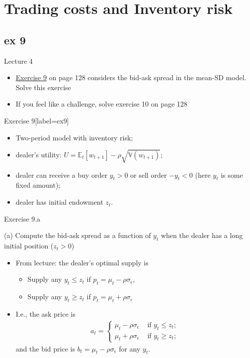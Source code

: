 \documentclass[english,10pt]{beamer}
\begin{document}
\section{Trading costs and Inventory risk}
\subsection{ex 9}

\begin{frame}{Lecture 4}
	\begin{itemize}
		\item \hyperlink{ex9}{Exercise 9} on page 128 considers the bid-ask spread in the mean-SD model. Solve this exercise
		\item If you feel like a challenge, solve exercise 10 on page 128
	\end{itemize}
\end{frame}


\begin{frame}{Exercise 9}[label=ex9]
	\begin{itemize}
		\item Two-period model with inventory risk;
		\item dealer's utility: $U = \mathbb{E}_t [w_{t+1}] - \rho \sqrt{\mathbb{V}(w_{t+1})}$;
		\item dealer can receive a buy order $y_t > 0$ or sell order $-y_t < 0$ (here $y_t$ is some fixed amount);
		\item dealer has initial endowment $z_t$.
	\end{itemize}
\end{frame}


\begin{frame}{Exercise 9.a}
	\begin{exampleblock}{}
		(a) Compute the bid-ask spread as a function of $y_t$ when the dealer has a long initial position ($z_t > 0$)
	\end{exampleblock}
	\pause
	\begin{itemize}
		\item From lecture: the dealer's optimal supply is
		\begin{itemize}
			\item Supply any $y_t \leq z_t$ if $p_t = \mu_t - \rho\sigma_{\epsilon}$,
			\item Supply any $y_t \geq z_t$ if $p_t = \mu_t + \rho\sigma_{\epsilon}$
		\end{itemize}
		\item I.e., the ask price is
		\begin{align*}
			a_t = 
			\begin{cases}
				\mu_t - \rho\sigma_{\epsilon} & \text{ if } y_t \leq z_t;
				\\
				\mu_t + \rho\sigma_{\epsilon} & \text{ if } y_t \geq z_t;
			\end{cases}
		\end{align*}
		and the bid price is $b_t = \mu_t - \rho\sigma_{\epsilon}$ for any $y_t$.
	\end{itemize}
\end{frame}
\end{document}
